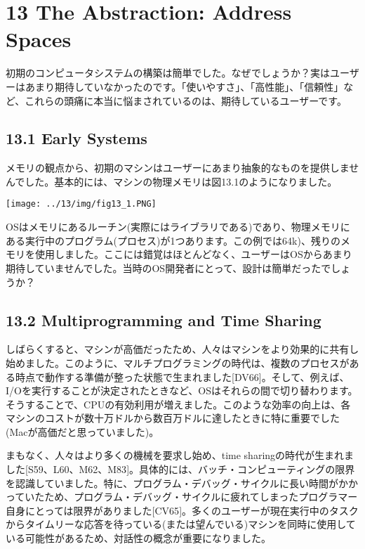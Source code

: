 \newpage

\hypertarget{the-abstraction-address-spaces}{%
\section*{13 The Abstraction: Address
Spaces}\label{the-abstraction-address-spaces}}

初期のコンピュータシステムの構築は簡単でした。なぜでしょうか？実はユーザーはあまり期待していなかったのです。「使いやすさ」、「高性能」、「信頼性」など、これらの頭痛に本当に悩まされているのは、期待しているユーザーです。

\hypertarget{early-systems}{%
\subsection*{13.1 Early Systems}\label{early-systems}}

メモリの観点から、初期のマシンはユーザーにあまり抽象的なものを提供しませんでした。基本的には、マシンの物理メモリは図13.1のようになりました。

\texttt{[image: ../13/img/fig13\_1.PNG]}

OSはメモリにあるルーチン(実際にはライブラリである)であり、物理メモリにある実行中のプログラム(プロセス)が1つあります。この例では64k)、残りのメモリを使用しました。ここには錯覚はほとんどなく、ユーザーはOSからあまり期待していませんでした。当時のOS開発者にとって、設計は簡単だったでしょうか？

\hypertarget{multiprogramming-and-time-sharing}{%
\subsection*{13.2 Multiprogramming and Time
Sharing}\label{multiprogramming-and-time-sharing}}

しばらくすると、マシンが高価だったため、人々はマシンをより効果的に共有し始めました。このように、マルチプログラミングの時代は、複数のプロセスがある時点で動作する準備が整った状態で生まれました{[}DV66{]}。そして、例えば、I/Oを実行することが決定されたときなど、OSはそれらの間で切り替わります。そうすることで、CPUの有効利用が増えました。このような効率の向上は、各マシンのコストが数十万ドルから数百万ドルに達したときに特に重要でした(Macが高価だと思っていました)。

まもなく、人々はより多くの機械を要求し始め、time
sharingの時代が生まれました{[}S59、L60、M62、M83{]}。具体的には、バッチ・コンピューティングの限界を認識していました。特に、プログラム・デバッグ・サイクルに長い時間がかかっていたため、プログラム・デバッグ・サイクルに疲れてしまったプログラマー自身にとっては限界がありました{[}CV65{]}。多くのユーザーが現在実行中のタスクからタイムリーな応答を待っている(または望んでいる)マシンを同時に使用している可能性があるため、対話性の概念が重要になりました。

